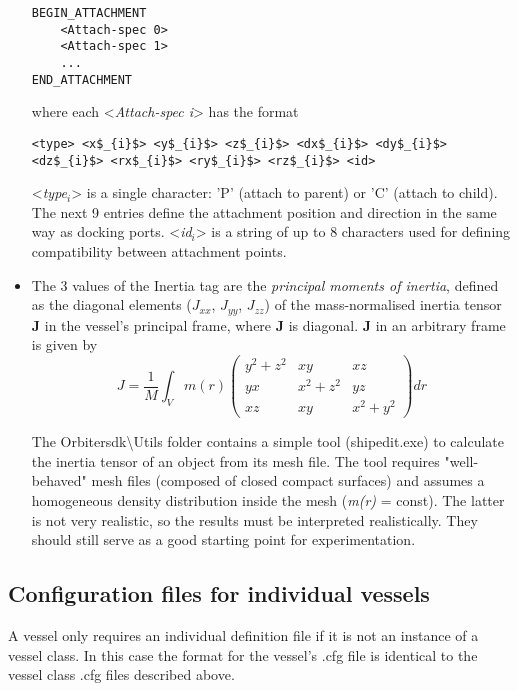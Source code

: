 \documentclass[Orbiter Developer Manual.tex]{subfiles}
\begin{document}
\begin{itemize}
\begin{lstlisting}[language=OSFS]
BEGIN_ATTACHMENT
	<Attach-spec 0>
	<Attach-spec 1>
	...
END_ATTACHMENT
\end{lstlisting}

\noindent
where each <\textit{Attach-spec i}> has the format

\begin{lstlisting}[language=OSFS,mathescape=true]
<type> <x$_{i}$> <y$_{i}$> <z$_{i}$> <dx$_{i}$> <dy$_{i}$> <dz$_{i}$> <rx$_{i}$> <ry$_{i}$> <rz$_{i}$> <id>
\end{lstlisting}

\noindent
<\textit{type}$_{i}$> is a single character: 'P' (attach to parent) or 'C' (attach to child). The next 9 entries define the attachment position and direction in the same way as docking ports. <\textit{id}$_{i}$> is a string of up to 8 characters used for defining compatibility between attachment points.

\item The 3 values of the Inertia tag are the \textit{principal moments of inertia}, defined as the diagonal elements ($J_{xx}$, $J_{yy}$, $J_{zz}$) of the mass-normalised inertia tensor \textbf{J} in the vessel's principal frame, where \textbf{J} is diagonal. \textbf{J} in an arbitrary frame is given by
\[ J = \frac{1}{M} \int_{V} m(r)  
\begin{pmatrix}
y^{2} + z^{2} & xy & xz\\
yx & x^{2} + z^{2} & yz\\
xz & xy & x^{2} + y^{2}
\end{pmatrix}
dr
\]

\noindent
The Orbitersdk\textbackslash Utils folder contains a simple tool (shipedit.exe) to calculate the inertia tensor of an object from its mesh file. The tool requires "well-behaved" mesh files (composed of closed compact surfaces) and assumes a homogeneous density distribution inside the mesh (\textit{m(r)} = const). The latter is not very realistic, so the results must be interpreted realistically. They should still serve as a good starting point for experimentation.

\end{itemize}


\subsection{Configuration files for individual vessels}
A vessel only requires an individual definition file if it is not an instance of a vessel class. In this case the format for the vessel's .cfg file is identical to the vessel class .cfg files described above.
\end{document}
